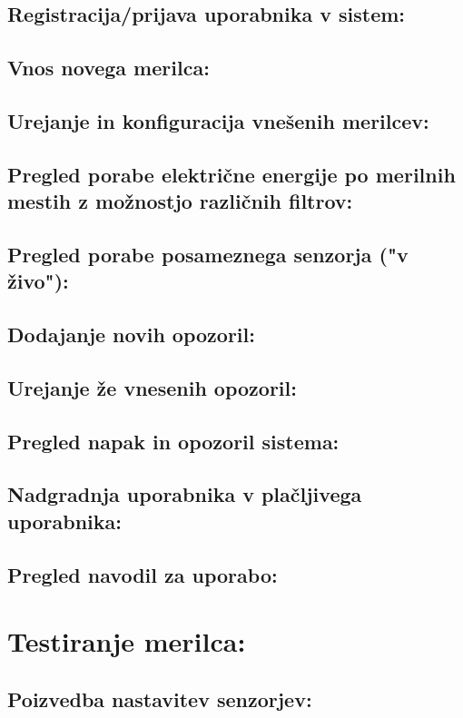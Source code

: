 \documentclass[12pt,a4paper,titlepage,openany]{report}
\begin{document}
\subsection{Registracija/prijava uporabnika v sistem:}
\subsection{Vnos novega merilca:}
\subsection{Urejanje in konfiguracija vnešenih merilcev:}
\subsection{Pregled porabe električne energije po merilnih mestih z možnostjo različnih filtrov:}
\subsection{Pregled porabe posameznega senzorja ("v živo"):}
\subsection{Dodajanje novih opozoril:}
\subsection{Urejanje že vnesenih opozoril:}
\subsection{Pregled napak in opozoril sistema:}
\subsection{Nadgradnja uporabnika v plačljivega uporabnika:}
\subsection{Pregled navodil za uporabo:}

\section{Testiranje merilca:}
\thispagestyle{fancy}


\subsection{Poizvedba nastavitev senzorjev:}
\end{document}
